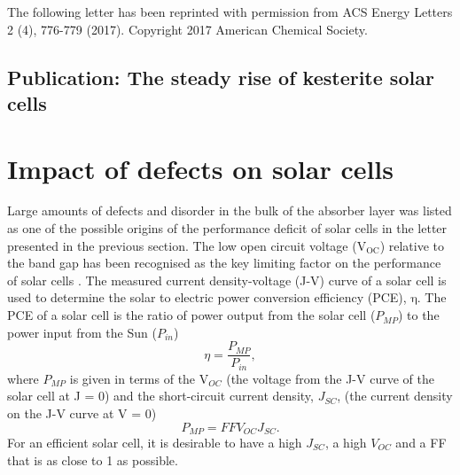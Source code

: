 \documentclass[11pt, twoside]{report}
\begin{document}
The following letter has been reprinted with permission from ACS Energy Letters 2 (4), 776-779 (2017). Copyright 2017 American Chemical Society.

\subsection{Publication: The steady rise of kesterite solar cells}






\section{Impact of defects on {\CZTS} solar cells}\label{CZTS_defects_lit}
Large amounts of defects and disorder in the bulk of the absorber layer was listed as one of the possible origins of the performance deficit of {\CZTS} solar cells in the letter presented in the previous section.
The low open circuit voltage (V$_\mathrm{{OC}}$) relative to the band gap has been recognised as the key limiting factor on the performance of {\CZTS} solar cells \cite{culprit}. 
The measured current density-voltage (J-V) curve of a solar cell is used to determine the solar to electric power conversion efficiency (PCE), $\mathrm{\eta}$. The PCE of a solar cell is the ratio of power output from the solar cell ($P_{MP}$) to the power input from the Sun ($P_{in}$)
\begin{equation} \label{PV_efficiency}
\eta = \frac{P_{MP}}{P_{in}},
\end{equation}
where $P_{MP}$ is given in terms of the V$_{OC}$ (the voltage from the J-V curve of the solar cell at J = 0) and the short-circuit current density, $J_{SC}$, (the current density on the J-V curve at V = 0) 
\begin{equation} \label{P_MP}
P_{MP} = FFV_{OC}J_{SC}.
\end{equation}
For an efficient solar cell, it is desirable to have a high $J_{SC}$, a high $V_{OC}$ and a FF that is as close to 1 as possible.
\end{document}
